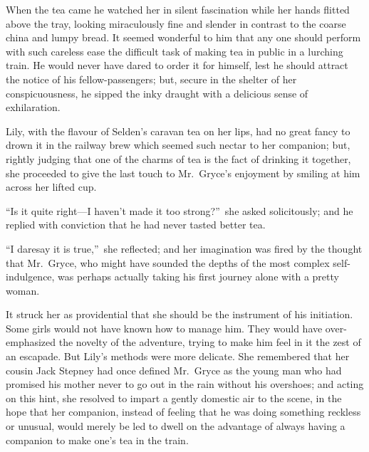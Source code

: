\documentclass[12pt,a4paper]{book}
\begin{document}
When the tea came he watched her in silent fascination while her
hands flitted above the tray, looking miraculously fine and
slender in contrast to the coarse china and lumpy bread. It
seemed wonderful to him that any one should perform with such
careless ease the difficult task of making tea in public in a
lurching train. He would never have dared to order it for
himself, lest he should attract the notice of his
fellow-passengers; but, secure in the shelter of her
conspicuousness, he sipped the inky draught with a delicious
sense of exhilaration.





Lily, with the flavour of Selden's caravan tea on her lips, had
no great fancy to drown it in the railway brew which seemed such
nectar to her companion; but, rightly judging that one of
the charms of tea is the fact of drinking it together, she
proceeded to give the last touch to Mr.\ Gryce's enjoyment by
smiling at him across her lifted cup.





``Is it quite right---I haven't made it too strong?''\ she asked
solicitously; and he replied with conviction that he had never
tasted better tea.





``I daresay it is true,''\ she reflected; and her imagination was
fired by the thought that Mr.\ Gryce, who might have sounded the
depths of the most complex self-indulgence, was perhaps actually
taking his first journey alone with a pretty woman.





It struck her as providential that she should be the instrument
of his initiation. Some girls would not have known how to manage
him. They would have over-emphasized the novelty of the
adventure, trying to make him feel in it the zest of an escapade. 
But Lily's methods were more delicate. She remembered that her
cousin Jack Stepney had once defined Mr.\ Gryce as the young man
who had promised his mother never to go out in the rain without
his overshoes; and acting on this hint, she resolved to impart a
gently domestic air to the scene, in the hope that her companion,
instead of feeling that he was doing something reckless or
unusual, would merely be led to dwell on the advantage of always
having a companion to make one's tea in the train.
\end{document}

